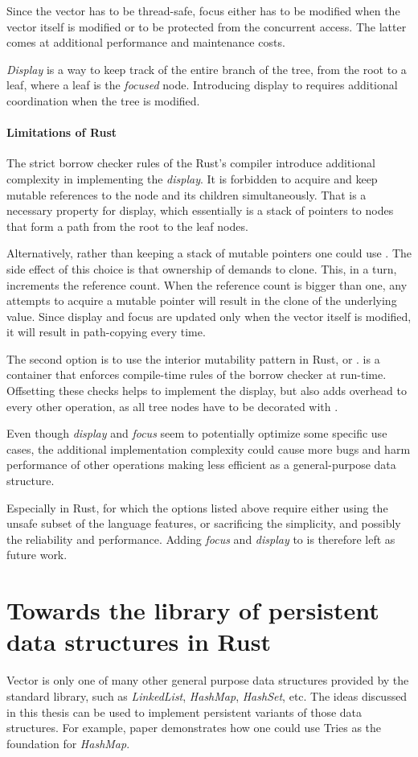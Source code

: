 Since the vector has to be thread-safe, focus either has to be modified when the vector itself is modified or to be protected from the concurrent access. The latter comes at additional performance and maintenance costs. 

\emph{Display} is a way to keep track of the entire branch of the tree, from the root to a leaf, where a leaf is the \emph{focused} node. Introducing display to \rrbtree{} requires additional coordination when the tree is modified. 

\paragraph{Limitations of Rust}
The strict borrow checker rules of the Rust's compiler introduce additional complexity in implementing the \emph{display}. It is forbidden to acquire and keep mutable references to the node and its children simultaneously. That is a necessary property for display, which essentially is a stack of pointers to nodes that form a path from the root to the leaf nodes. 

Alternatively, rather than keeping a stack of mutable pointers one could use \rc{}. The side effect of this choice is that ownership of \rc{} demands to clone. This, in a turn, increments the reference count. When the reference count is bigger than one, any attempts to acquire a mutable pointer will result in the clone of the underlying value. Since display and focus are updated only when the vector itself is modified, it will result in path-copying every time.

The second option is to use the interior mutability pattern in Rust, or .  is a container that enforces compile-time rules of the borrow checker at run-time. Offsetting these checks helps to implement the display, but also adds overhead to every other operation, as all tree nodes have to be decorated with .  

Even though \emph{display} and \emph{focus} seem to potentially optimize some specific use cases, the additional implementation complexity could cause more bugs and harm performance of other operations making \rrbtree{} less efficient as a general-purpose data structure. 

Especially in Rust, for which the options listed above require either using the unsafe subset of the language features, or sacrificing the simplicity, and possibly the reliability and performance. Adding \emph{focus} and \emph{display} to \rrbvec{} is therefore left as future work.

\section{Towards the library of persistent data structures in Rust}

Vector is only one of many other general purpose data structures provided by the standard library, such as \emph{LinkedList}, \emph{HashMap}, \emph{HashSet}, etc. The ideas discussed in this thesis can be used to implement persistent variants of those data structures. For example,  paper demonstrates how one could use Tries as the foundation for \emph{HashMap}. 
